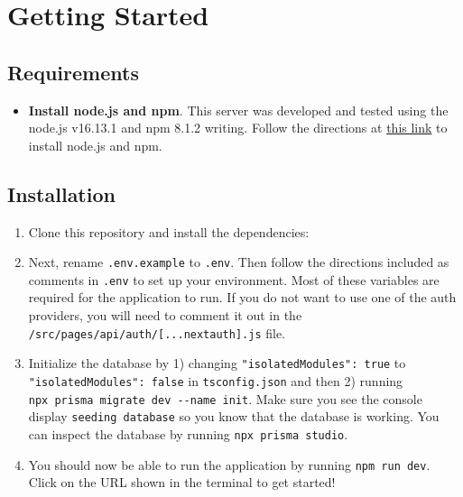 \hypertarget{getting-started}{%
\section{Getting Started}\label{getting-started}}

\hypertarget{requirements}{%
\subsection{Requirements}\label{requirements}}

\begin{itemize}
\tightlist
\item
  \textbf{Install node.js and npm}. This server was developed and tested
  using the node.js v16.13.1 and npm 8.1.2 writing. Follow the
  directions at \href{https://nodejs.org/en/download/}{this link} to
  install node.js and npm.
\end{itemize}

\hypertarget{installation}{%
\subsection{Installation}\label{installation}}

\begin{enumerate}
\def\labelenumi{\arabic{enumi}.}
\item
  Clone this repository and install the dependencies:

\begin{Shaded}
\begin{Highlighting}[]
\end{Highlighting}
\end{Shaded}
\item
  Next, rename \texttt{.env.example} to \texttt{.env}. Then follow the
  directions included as comments in \texttt{.env} to set up your
  environment. Most of these variables are required for the application
  to run. If you do not want to use one of the auth providers, you will
  need to comment it out in the
  \texttt{/src/pages/api/auth/{[}...nextauth{]}.js} file.
\item
  Initialize the database by 1) changing
  \texttt{"isolatedModules":\ true} to
  \texttt{"isolatedModules":\ false} in \texttt{tsconfig.json} and then
  2) running \texttt{npx\ prisma\ migrate\ dev\ -\/-name\ init}. Make
  sure you see the console display \texttt{seeding\ database} so you
  know that the database is working. You can inspect the database by
  running \texttt{npx\ prisma\ studio}.
\item
  You should now be able to run the application by running
  \texttt{npm\ run\ dev}. Click on the URL shown in the terminal to get
  started!
\end{enumerate}

